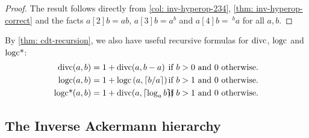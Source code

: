 \begin{proof}
	The result follows directly from \cref{col: inv-hyperop-234}, \cref{thm: inv-hyperop-correct} and the facts $a[2]b = ab$, $a[3]b = a^b$ and $a[4]b = \ ^ba$ for all $a, b$.
\end{proof}
\begin{rem}
	By \cref{thm: cdt-recursion}, we also have useful recursive formulas for $\text{divc}$, $\text{logc}$ and $\text{logc*}$:
	\begin{align*}
	\divc(a, b) & = 1 + \divc(a, b - a) &\hspace{-20pt} \text{ if } b > 0 &\text{ and } 0 \text{ otherwise}. \\
	\logc(a, b) & = 1 + \logc\left(a, \left\lceil b/a \right\rceil\right) &\hspace{-20pt} \text{ if } b > 1 &\text{ and } 0 \text{ otherwise}. \\
	\logstarc(a, b) & = 1 + \divc(a, \left\lceil \log_ab \right\rceil) &\hspace{-20pt} \text{ if } b > 1 &\text{ and } 0 \text{ otherwise}.
	\end{align*}
\end{rem}

\subsection{The Inverse Ackermann hierarchy}

